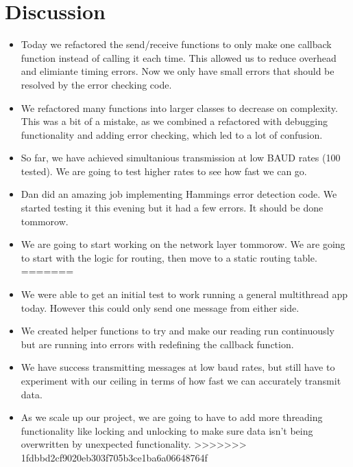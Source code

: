 \documentclass{article}
\begin{document}
\section*{Discussion}
\begin{itemize}
<<<<<<< HEAD
    \item Today we refactored the send/receive functions to only make one callback function instead of calling it each time.
    This allowed us to reduce overhead and elimiante timing errors. Now we only have small errors that should be resolved by 
    the error checking code. 
    \item We refactored many functions into larger classes to decrease on complexity. This was a bit of a mistake, as we combined a refactored
    with debugging functionality and adding error checking, which led to a lot of confusion.
    \item So far, we have achieved simultanious transmission at low BAUD rates (100 tested). We are going to test higher rates to see how fast we can go.
    \item Dan did an amazing job implementing Hammings error detection code. We started testing it this evening but it had a few errors. It should be done tommorow.
    \item We are going to start working on the network layer tommorow. We are going to start with the logic for routing, then move to a static routing table.
=======
    \item We were able to get an initial test to work running a general multithread app today. However this could only send one message from either side.
    \item We created helper functions to try and make our reading run continuously but are running into errors with redefining the callback function.
    \item We have success transmitting messages at low baud rates, but still have to experiment with our ceiling in terms of how fast we can accurately transmit data.
    \item As we scale up our project, we are going to have to add more threading functionality like locking and unlocking to make sure 
    data isn't being overwritten by unexpected functionality.
>>>>>>> 1fdbbd2cf9020eb303f705b3ce1ba6a06648764f
\end{itemize}

\end{document}
